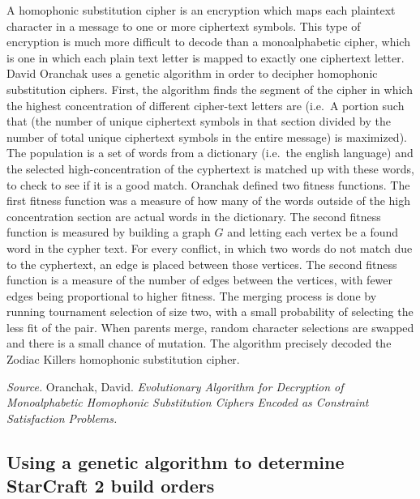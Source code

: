 \documentclass[11pt]{amsart}
\begin{document}
A homophonic substitution cipher is an encryption which maps each plaintext
character in a message to one or more ciphertext symbols.  This type of
encryption is much more difficult to decode than a monoalphabetic cipher, which
is one in which each plain text letter is mapped to exactly one ciphertext
letter.  David Oranchak uses a genetic algorithm in order to decipher
homophonic substitution ciphers.  First, the algorithm finds the segment of the
cipher in which the highest concentration of different cipher-text letters are
(i.e.\ A portion such that (the number of unique ciphertext symbols in that
section divided by the number of total unique ciphertext symbols in the entire
message) is maximized). The population is a set of words from a dictionary
(i.e.\ the english language) and the selected high-concentration of the
cyphertext is matched up with these words, to check to see if it is a good
match.  Oranchak defined two fitness functions.  The first fitness function was
a measure of how many of the words outside of the high concentration section
are actual words in the dictionary.  The second fitness function is measured by
building a graph $G$ and letting each vertex be a found word in the cypher
text.  For every conflict, in which two words do not match due to the
cyphertext, an edge is placed between those vertices.  The second fitness
function is a measure of the number of edges between the vertices, with fewer
edges being proportional to higher fitness.  The merging process is done by
running tournament selection of size two, with a small probability of selecting
the less fit of the pair.  When parents merge, random character selections are
swapped and there is a small chance of mutation.  The algorithm precisely
decoded the Zodiac Killers homophonic substitution cipher.

\emph{Source.} Oranchak, David.  \emph{Evolutionary Algorithm for Decryption of
Monoalphabetic Homophonic Substitution Ciphers Encoded as Constraint
Satisfaction Problems.}

\subsection*{Using a genetic algorithm to determine StarCraft 2 build orders}
\end{document}
